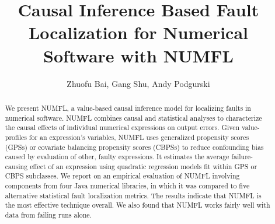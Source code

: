 \documentclass[times]{stvrauth}
\begin{document}

\title{Causal Inference Based Fault Localization for Numerical Software with NUMFL}

\author{Zhuofu Bai, Gang Shu, Andy Podgurski\corrauth}

\address{Department of Electrical Engineering and Computer Science
Case Western Reserve University
Cleveland, OH 44106}


\begin{abstract}
We present NUMFL, a value-based causal inference model for localizing faults in numerical software.  NUMFL combines causal and statistical analyses to characterize the causal effects of individual numerical expressions on output errors.  Given value-profiles for an expression's variables, NUMFL uses generalized propensity scores (GPSs) or covariate balancing propensity scores (CBPSs) to reduce confounding bias caused by evaluation of other, faulty expressions.  It estimates the average failure-causing effect of an expression using quadratic regression models fit within GPS or CBPS subclasses.  We report on an empirical evaluation of NUMFL involving components from four Java numerical libraries, in which it was compared to five alternative statistical fault localization metrics.  The results indicate that NUMFL is the most effective technique overall. We also found that NUMFL works fairly well with data from failing runs alone.
\end{abstract}


\maketitle

%
\end{document}
